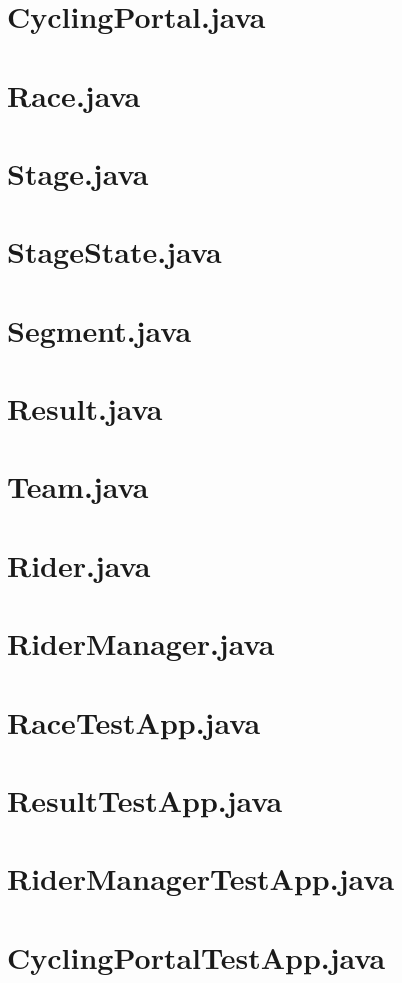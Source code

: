 \documentclass{article}
\begin{document}
\section{CyclingPortal.java}


\section{Race.java}


\section{Stage.java}


\section{StageState.java}


\section{Segment.java}


\section{Result.java}


\section{Team.java}


\section{Rider.java}


\section{RiderManager.java}


\section{RaceTestApp.java}


\section{ResultTestApp.java}


\section{RiderManagerTestApp.java}


\section{CyclingPortalTestApp.java}

\end{document}
